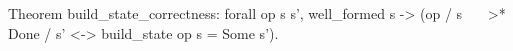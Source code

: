Theorem build_state_correctness:
  forall op s s',
    well_formed s ->
    (op / s ~~~>* Done / s' <-> build_state op s = Some s').